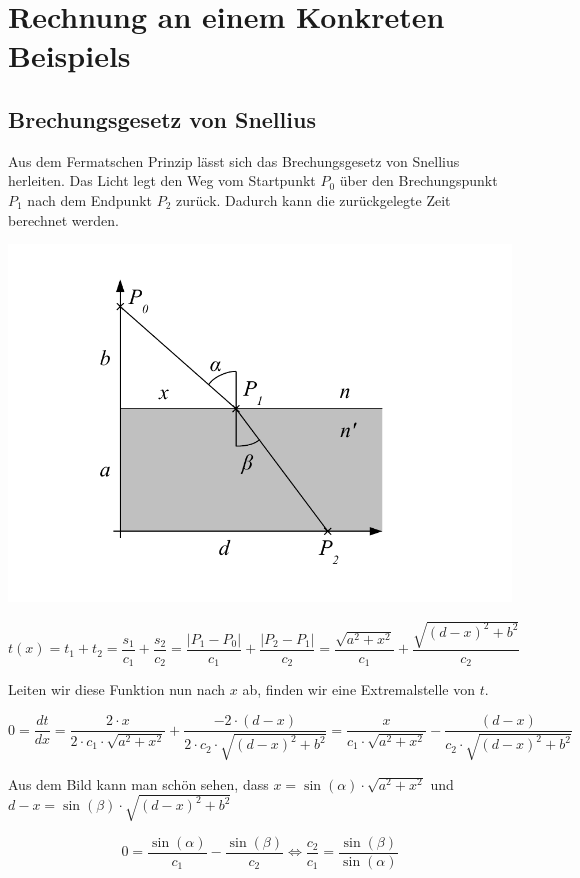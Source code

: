 \section{Rechnung an einem Konkreten Beispiels}

\subsection{Brechungsgesetz von Snellius}
\cite{Wikipedia}Aus dem Fermatschen Prinzip lässt sich das Brechungsgesetz von Snellius herleiten.
Das Licht legt den Weg vom Startpunkt $P_0$ über den Brechungspunkt $P_1$ 
nach dem Endpunkt $P_2$ zurück. Dadurch kann die zurückgelegte Zeit berechnet werden.

\includegraphics{./picture/Brechung.pdf}



\[
t(x) =
t_1 + t_2 =
\frac{s_1}{c_1} + \frac{s_2}{c_2} =
\frac{|P_1 - P_0|}{c_1} + \frac{|P_2 - P_1|}{c_2} =
\frac{\sqrt{a^2 + x^2}}{c_1} + \frac{\sqrt{(d-x)^2 + b^2}}{c_2}
\]

Leiten wir diese Funktion nun nach $x$ ab, finden wir eine Extremalstelle von $t$.

\[
0 = 
\frac{dt}{dx} =
\frac{2 \cdot x}{2 \cdot c_1 \cdot \sqrt{a^2 + x^2}} + 
\frac{-2 \cdot (d-x)}{2 \cdot c_2 \cdot \sqrt{(d-x)^2 + b^2}} =
\frac{x}{c_1 \cdot \sqrt{a^2 + x^2}} - 
\frac{(d-x)}{c_2 \cdot \sqrt{(d-x)^2 + b^2}}
\]

Aus dem Bild kann man schön sehen, dass $x = \sin(\alpha) \cdot \sqrt{a^2 + x^2}$
und $d-x = \sin(\beta) \cdot \sqrt{(d -x)^2 + b^2}$

\[
0 = 
\frac{\sin(\alpha)}{c_1} - \frac{\sin(\beta)}{c_2} \Leftrightarrow
\frac{c_2}{c_1} = \frac{\sin(\beta)}{\sin(\alpha)}
\]

